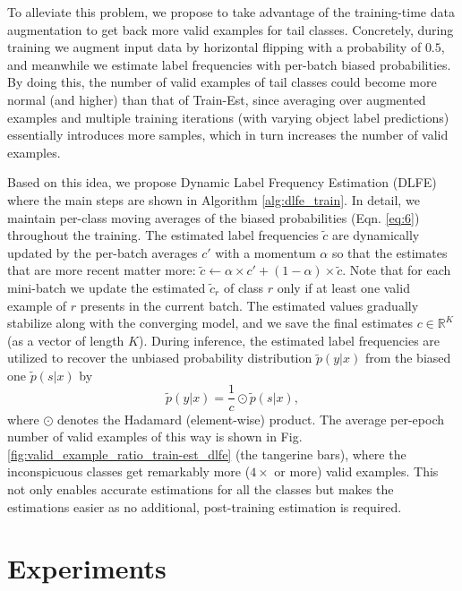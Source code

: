 \documentclass[sigconf]{acmart}
\begin{document}
To alleviate this problem, we propose to take advantage of the training-time data augmentation to get back more valid examples for tail classes.
Concretely, during training we augment input data by horizontal flipping with a probability of $0.5$, and meanwhile we estimate label frequencies with per-batch biased probabilities.
By doing this, the number of valid examples of tail classes could become more normal (and higher) than that of Train-Est, since averaging over augmented examples and multiple training iterations (with varying object label predictions) essentially introduces more samples, which in turn increases the number of valid examples.

Based on this idea, we propose Dynamic Label Frequency Estimation (DLFE) where the main steps are shown in Algorithm \ref{alg:dlfe_train}.
In detail, we maintain per-class moving averages of the biased probabilities (Eqn. \ref{eq:6}) throughout the training.
The estimated label frequencies $\tilde{c}$ are dynamically updated by the per-batch averages $c'$ with a momentum $\alpha$ so that the estimates that are more recent matter more: $\tilde{c} \leftarrow \alpha \times c' + (1 - \alpha) \times \tilde{c}$.
Note that for each mini-batch we update the estimated $\tilde{c}_r$ of class $r$ only if at least one valid example of $r$ presents in the current batch.
The estimated values gradually stabilize along with the converging model, and we save the final estimates $c \in \mathbb{R}^K$ (as a vector of length $K$).
During inference, the estimated label frequencies are utilized to recover the unbiased probability distribution $\tilde{p}(y|x)$ from the biased one $\tilde{p}(s|x)$ by
\begin{equation}
    \tilde{p}(y|x) = \frac{1}{c} \odot \tilde{p}(s|x),
\end{equation}
where $\odot$ denotes the Hadamard (element-wise) product.
The average per-epoch number of valid examples of this way is shown in Fig. \ref{fig:valid_example_ratio_train-est_dlfe} (the tangerine bars), where the inconspicuous classes get remarkably more ($4\times$ or more) valid examples.
This not only enables accurate estimations for all the classes but makes the estimations easier as no additional, post-training estimation is required.

\section{Experiments}
\end{document}
